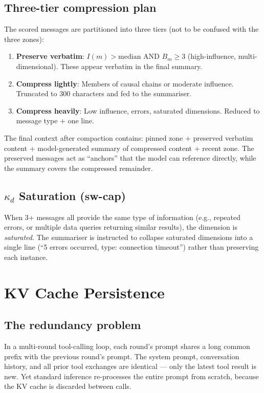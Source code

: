 \documentclass[11pt,a4paper]{article}
\begin{document}
\subsection{Three-tier compression plan}

The scored messages are partitioned into three tiers (not to be confused with the three zones):

\begin{enumerate}[nosep]
  \item \textbf{Preserve verbatim}: $I(m) > \text{median}$ AND $B_m \geq 3$ (high-influence, multi-dimensional). These appear verbatim in the final summary.
  \item \textbf{Compress lightly}: Members of causal chains or moderate influence. Truncated to 300 characters and fed to the summariser.
  \item \textbf{Compress heavily}: Low influence, errors, saturated dimensions. Reduced to message type + one line.
\end{enumerate}

\noindent The final context after compaction contains: pinned zone + preserved verbatim content + model-generated summary of compressed content + recent zone. The preserved messages act as ``anchors'' that the model can reference directly, while the summary covers the compressed remainder.

\subsection{$\kappa_d$ Saturation (sw-cap)}

When 3+ messages all provide the same type of information (e.g., repeated errors, or multiple data queries returning similar results), the dimension is \emph{saturated}. The summariser is instructed to collapse saturated dimensions into a single line (``5 errors occurred, type: connection timeout'') rather than preserving each instance.

\section{KV Cache Persistence}

\subsection{The redundancy problem}

In a multi-round tool-calling loop, each round's prompt shares a long common prefix with the previous round's prompt. The system prompt, conversation history, and all prior tool exchanges are identical --- only the latest tool result is new. Yet standard inference re-processes the entire prompt from scratch, because the KV cache is discarded between calls.
\end{document}
